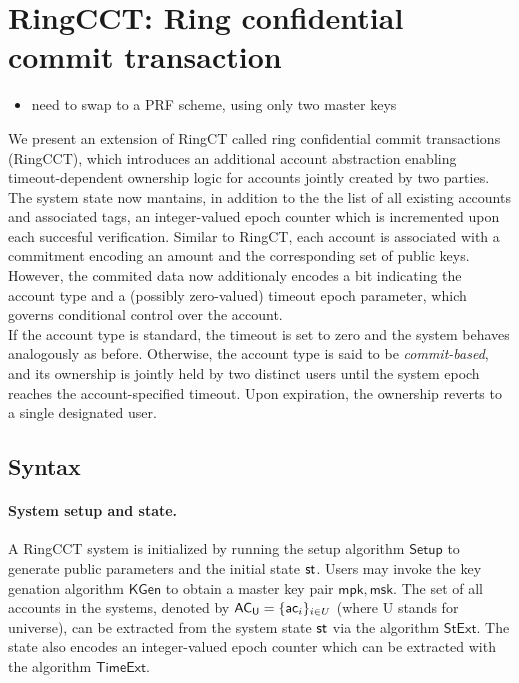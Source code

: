 
\section{RingCCT: Ring confidential commit transaction}
\begin{todobox}
\begin{itemize}
\item need to swap to a PRF scheme, using only two master keys
\end{itemize}
\end{todobox}

We present an extension of RingCT called ring confidential commit transactions (RingCCT), 
which introduces an additional account abstraction enabling timeout-dependent ownership logic for accounts jointly created by two parties. The system state now mantains, in addition to the the list of all existing accounts and associated tags, an integer-valued epoch counter which is incremented upon each succesful verification. Similar to RingCT, each account is associated with a commitment encoding an amount and the corresponding set of public keys. However, the commited data now additionaly encodes a bit indicating the account type and a (possibly zero-valued) timeout epoch parameter, which governs conditional control over the account. \\ 
If the account type is standard, the timeout is set to zero and the system behaves analogously as before. Otherwise, the account type is said to be \textit{commit-based}, and its ownership is jointly held by two distinct users until the system epoch reaches the account-specified timeout. Upon expiration, the ownership reverts to a single designated user. 

\subsection{Syntax}
\paragraph*{System setup and state.} A RingCCT system is initialized by running the setup algorithm $\mathsf{Setup}$ to generate public parameters and the initial state $\st$. Users may invoke the key genation algorithm $\mathsf{KGen}$ to obtain a master key pair $\mathsf{mpk}, \mathsf{msk}$. 
The set of all accounts in the systems, denoted by $\mathsf{AC_U} = \{ \mathsf{ac}_i \}_{i\in U}$ (where U stands for universe), can be extracted from the system state $\st$ via the algorithm $\mathsf{StExt}$. The state also encodes an integer-valued epoch counter which can be extracted with the algorithm $\mathsf{TimeExt}$.

